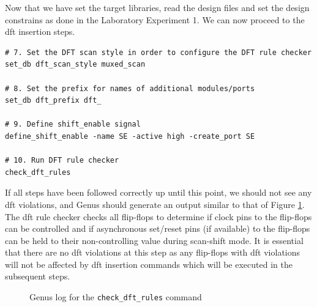 \documentclass[a4paper,11pt]{article}%
\begin{document}
Now that we have set the target libraries, read the design files and set the design constrains as done in the Laboratory Experiment 1. We can now proceed to the \ac{dft} insertion steps.
 
\begin{Verbatim}[frame=single]
# 7. Set the DFT scan style in order to configure the DFT rule checker
set_db dft_scan_style muxed_scan

# 8. Set the prefix for names of additional modules/ports
set_db dft_prefix dft_

# 9. Define shift_enable signal
define_shift_enable -name SE -active high -create_port SE

# 10. Run DFT rule checker
check_dft_rules
\end{Verbatim}

If all steps have been followed correctly up until this point, 
we should not see any \ac{dft}  violations, and Genus should generate an output similar to that of Figure \ref{fig:check_dft_rules}. The \ac{dft} rule checker checks all flip-flops to determine if clock pins to the flip-flops can be controlled and if asynchronous set/reset pins (if available) to the flip-flops can be held to their non-controlling value during scan-shift mode. It is essential that there are no \ac{dft} violations at this step as any flip-flops with \ac{dft} violations will not be affected by \ac{dft} insertion commands which will be executed in the subsequent steps.

\begin{figure}[H]
	\centering
	\caption{Genus log for the {\tt check\_dft\_rules} command}
	\label{fig:check_dft_rules}
\end{figure}
\end{document}
